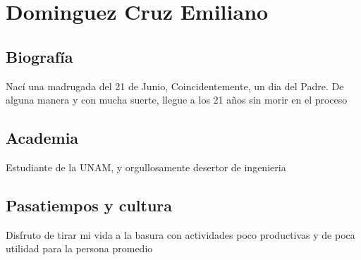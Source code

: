 \chapter{Dominguez Cruz Emiliano}
\section{Biografía}
Nací una madrugada del 21 de Junio, Coincidentemente, un dia del Padre. De alguna manera y con mucha suerte, llegue a los 21 años sin morir en el proceso
\section{Academia}
Estudiante de la UNAM, y orgullosamente desertor de ingenieria
\section{Pasatiempos y cultura}
Disfruto de tirar mi vida a la basura con actividades poco productivas y de poca utilidad para la persona promedio\\


